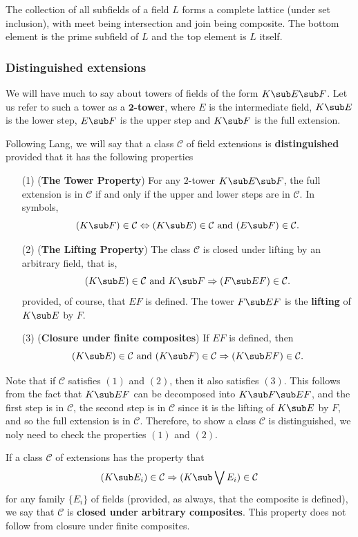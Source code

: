 The collection of all subfields of a field $L$ forms a complete lattice (under set inclusion), with meet being intersection and join being composite. The bottom element is the prime subfield of $L$ and the top element is $L$ itself.\par
\subsubsection{Distinguished extensions}
We will have much to say about towers of fields of the form $K\sub E\sub F$. Let us refer to such a tower as a \textbf{$\bm{2}$-tower}, where $E$ is the intermediate field, $K\sub E$ is the lower step, $E\sub F$ is the upper step and $K\sub F$ is the full extension.\par
Following Lang, we will say that a class $\mathcal{C}$ of field extensions is \textbf{distinguished} provided that it has the following properties
\begin{itemize}
\item[(1)] (\textbf{The Tower Property}) For any $2$-tower $K\sub E\sub F$, the full extension is in $\mathcal{C}$ if and only if the upper and lower steps are in $\mathcal{C}$. In symbols,
\[(K\sub F)\in\mathcal{C}\Leftrightarrow (K\sub E)\in\mathcal{C}\text{ and }(E\sub F)\in\mathcal{C}.\] 
\item[(2)] (\textbf{The Lifting Property}) The class $\mathcal{C}$ is closed under lifting by an arbitrary field, that is,
\[(K\sub E)\in\mathcal{C}\text{ and }K\sub F\Rightarrow(F\sub EF)\in\mathcal{C}.\] 
provided, of course, that $EF$ is defined. The tower $F\sub EF$ is the \textbf{lifting} of $K\sub E$ by $F$.
\item[(3)] (\textbf{Closure under finite composites}) If $EF$ is defined, then
\[(K\sub E)\in\mathcal{C}\text{ and }(K\sub F)\in\mathcal{C}\Rightarrow(K\sub EF)\in\mathcal{C}.\] 
\end{itemize}
Note that if $\mathcal{C}$ satisfies $(1)$ and $(2)$, then it also satisfies $(3)$. This follows from the fact that $K\sub EF$ can be decomposed into $K\sub F\sub EF$, and the first step is in $\mathcal{C}$, the second step is in $\mathcal{C}$ since it is the lifting of $K\sub E$
by $F$, and so the full extension is in $\mathcal{C}$. Therefore, to show a class $\mathcal{C}$ is distinguished, we noly need to check the properties $(1)$ and $(2)$.\par
If a class $\mathcal{C}$ of extensions has the property that
\[(K\sub E_i)\in\mathcal{C}\Rightarrow(K\sub\bigvee E_i)\in\mathcal{C}\]
for any family $\{E_i\}$ of fields (provided, as always, that the composite is defined), we say that $\mathcal{C}$ is \textbf{closed under arbitrary composites}. This property does not follow from closure under finite composites.\par
